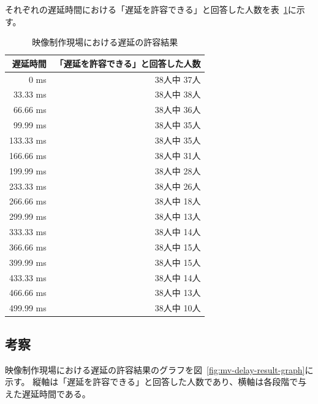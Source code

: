 それぞれの遅延時間における「遅延を許容できる」と回答した人数を表~\ref{tb:mv-delay-result}に示す。

\begin{table}[htbp]
  \caption{映像制作現場における遅延の許容結果}
  \label{tb:mv-delay-result}
  \begin{center}
  \begin{tabular}{r|r}
    \hline
    遅延時間   & 「遅延を許容できる」と回答した人数 \\\hline\hline
    0 ms      & 38人中 37人 \\\hline
    33.33 ms  & 38人中 38人 \\\hline
    66.66 ms  & 38人中 36人 \\\hline
    99.99 ms  & 38人中 35人 \\\hline
    133.33 ms & 38人中 35人 \\\hline
    166.66 ms & 38人中 31人 \\\hline
    199.99 ms & 38人中 28人 \\\hline
    233.33 ms & 38人中 26人 \\\hline
    266.66 ms & 38人中 18人 \\\hline
    299.99 ms & 38人中 13人 \\\hline
    333.33 ms & 38人中 14人 \\\hline
    366.66 ms & 38人中 15人 \\\hline
    399.99 ms & 38人中 15人 \\\hline
    433.33 ms & 38人中 14人 \\\hline
    466.66 ms & 38人中 13人 \\\hline
    499.99 ms & 38人中 10人 \\\hline
  \end{tabular}\end{center}
\end{table}

\newpage
\subsection{考察}

映像制作現場における遅延の許容結果のグラフを図~\ref{fig:mv-delay-result-graph}に示す。
縦軸は「遅延を許容できる」と回答した人数であり、横軸は各段階で与えた遅延時間である。

